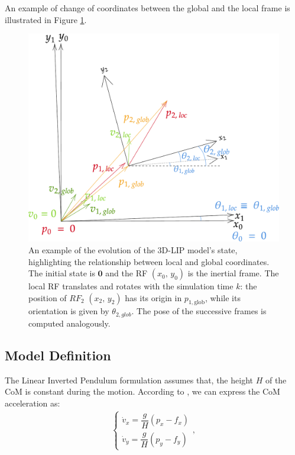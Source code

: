 An example of change of coordinates between the global and the local frame is illustrated in Figure \ref{fig:loc_to_glob_tfm}.


\begin{figure}[h]
    \centering
    \includegraphics[width=0.75\linewidth]{figures/LIP/loc_to_glob_tfm2.pdf}
    \caption{An example of the evolution of the 3D-LIP model's state, highlighting the relationship between local and global coordinates. The initial state is $\mathbf{0}$ and the RF $(x_0,\, y_0)$ is the inertial frame. The local RF translates and rotates with the simulation time $k$: the position of $RF_2$ $(x_2,\, y_2)$ has its origin in $p_{1, \text{glob}}$, while its orientation is given by $\theta_{2, glob}$. The pose of the successive frames is computed analogously.}
    \label{fig:loc_to_glob_tfm}
\end{figure}

\subsection{Model Definition}
The Linear Inverted Pendulum formulation assumes that, the height $H$ of the CoM is constant during the motion.
According to \cite{peng_main_paper}, we can express the CoM acceleration as:
\begin{align}
    \begin{cases}
        \dot{v}_{x} = \dfrac{g}{H}(p_{x} - f_{x})
        \\[1ex]
        \dot{v}_{y} = \dfrac{g}{H}(p_{y} - f_{y})
    \end{cases},
\end{align}

